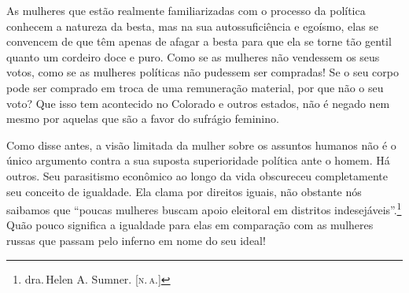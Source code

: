 As mulheres que estão realmente familiarizadas com o processo da
política conhecem a natureza da besta, mas na sua autossuficiência e
egoísmo, elas se convencem de que têm apenas de afagar a besta para que
ela se torne tão gentil quanto um cordeiro doce e puro. Como se as
mulheres não vendessem os seus votos, como se as mulheres políticas não
pudessem ser compradas! Se o seu corpo pode ser comprado em troca de uma
remuneração material, por que não o seu voto? Que isso tem acontecido no
Colorado e outros estados, não é negado nem mesmo por aquelas que são a
favor do sufrágio feminino.

Como disse antes, a visão limitada da mulher sobre os assuntos humanos
não é o único argumento contra a sua suposta superioridade política ante
o homem. Há outros. Seu parasitismo econômico ao longo da vida
obscureceu completamente seu conceito de igualdade. Ela clama por
direitos iguais, não obstante nós saibamos que ``poucas mulheres buscam
apoio eleitoral em distritos indesejáveis''.\footnote{dra.\,Helen A.
  Sumner. [\textsc{n.\,a.}]} Quão pouco significa a igualdade para elas em
comparação com as mulheres russas que passam pelo inferno em nome do seu
ideal!

